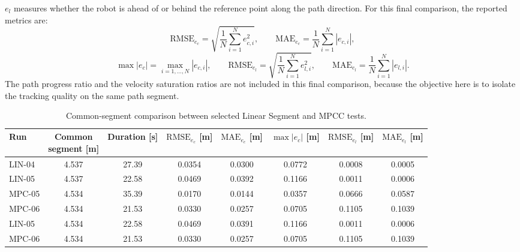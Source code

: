   \(e_l\) measures whether the robot is ahead of or behind the reference point
  along the path direction.  For this final comparison, the reported metrics are:
  \begin{equation}
      \mathrm{RMSE}_{e_c}
      =
      \sqrt{
          \frac{1}{N}
          \sum_{i=1}^{N} e_{c,i}^{2}
      },
      \qquad
      \mathrm{MAE}_{e_c}
      =
      \frac{1}{N}
      \sum_{i=1}^{N} |e_{c,i}|,
  \end{equation}
  \begin{equation}
      \max |e_c|
      =
      \max_{i=1,\dots,N} |e_{c,i}|,
      \qquad
      \mathrm{RMSE}_{e_l}
      =
      \sqrt{
          \frac{1}{N}
          \sum_{i=1}^{N} e_{l,i}^{2}
      },
      \qquad
      \mathrm{MAE}_{e_l}
      =
      \frac{1}{N}
      \sum_{i=1}^{N} |e_{l,i}|.
  \end{equation}
  The path progress ratio and the velocity saturation ratios are not included in
this final comparison, because the objective here is to isolate the tracking
quality on the same path segment.

\begin{table}[H]
\centering
\caption{Common-segment comparison between selected Linear Segment and MPCC
tests.}
\label{tab:common_segment_comparison}
\scriptsize
\setlength{\tabcolsep}{3pt}
\renewcommand{\arraystretch}{1.05}
\begin{tabular}{lccccccc}
\toprule
\textbf{Run} &
\shortstack{\textbf{Common}\\\textbf{segment [m]}} &
\textbf{Duration [s]} &
\(\mathrm{RMSE}_{e_c}\) [m] &
\(\mathrm{MAE}_{e_c}\) [m] &
\(\max |e_c|\) [m] &
\(\mathrm{RMSE}_{e_l}\) [m] &
\(\mathrm{MAE}_{e_l}\) [m] \\
\midrule
LIN-04 & 4.537 & 27.39 & 0.0354 & 0.0300 & 0.0772 & 0.0008 & 0.0005 \\
  LIN-05 & 4.537 & 22.58 & 0.0469 & 0.0392 & 0.1166 & 0.0011 & 0.0006 \\
\midrule
MPC-05 & 4.534 & 35.39 & 0.0170 & 0.0144 & 0.0357 & 0.0666 & 0.0587 \\
MPC-06 & 4.534 & 21.53 & 0.0330 & 0.0257 & 0.0705 & 0.1105 & 0.1039 \\
\midrule
LIN-05 & 4.534 & 22.58 & 0.0469 & 0.0391 & 0.1166 & 0.0011 & 0.0006 \\
MPC-06 & 4.534 & 21.53 & 0.0330 & 0.0257 & 0.0705 & 0.1105 & 0.1039 \\
\bottomrule
\end{tabular}
\end{table}

